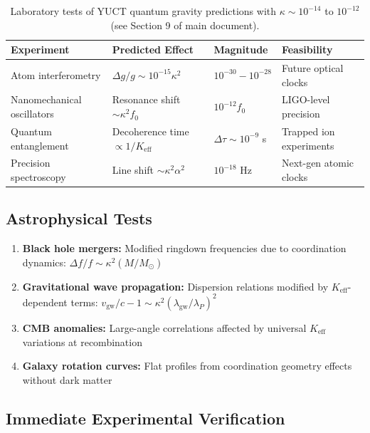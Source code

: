 \documentclass[12pt,a4paper]{article}
\theoremstyle{remark}
\newcommand{\Keff}{K_{\mathrm{eff}}}
\begin{document}
\begin{table}[htbp]
	\centering
	\begin{tabular}{p{2.8cm}p{4.2cm}p{2.5cm}p{2.5cm}}
		\toprule
		\textbf{Experiment} & \textbf{Predicted Effect} & \textbf{Magnitude} & \textbf{Feasibility} \\
		\midrule
		Atom interferometry & $\Delta g/g \sim 10^{-15}\kappa^2$ & $10^{-30} - 10^{-28}$ & Future optical clocks \\
		Nanomechanical oscillators & Resonance shift $\sim \kappa^2 f_0$ & $10^{-12} f_0$ & LIGO-level precision \\
		Quantum entanglement & Decoherence time $\propto 1/\Keff$ & $\Delta\tau \sim 10^{-9}$ s & Trapped ion experiments \\
		Precision spectroscopy & Line shift $\sim \kappa^2 \alpha^2$ & $10^{-18}$ Hz & Next-gen atomic clocks \\
		\bottomrule
	\end{tabular}
	\caption{Laboratory tests of YUCT quantum gravity predictions with $\kappa \sim 10^{-14}$ to $10^{-12}$ (see Section 9 of main document).}
	\label{tab:lab-tests}
\end{table}
	
	\subsection{Astrophysical Tests}
	
	\begin{enumerate}
		\item \textbf{Black hole mergers:} Modified ringdown frequencies due to coordination dynamics: $\Delta f/f \sim \kappa^2 (M/M_\odot)$
		
		\item \textbf{Gravitational wave propagation:} Dispersion relations modified by $\Keff$-dependent terms: $v_{\text{gw}}/c - 1 \sim \kappa^2 (\lambda_{\text{gw}}/\lambda_P)^2$
		
		\item \textbf{CMB anomalies:} Large-angle correlations affected by universal $\Keff$ variations at recombination
		
		\item \textbf{Galaxy rotation curves:} Flat profiles from coordination geometry effects without dark matter
	\end{enumerate}
	
	\subsection{Immediate Experimental Verification}
	
\end{document}
